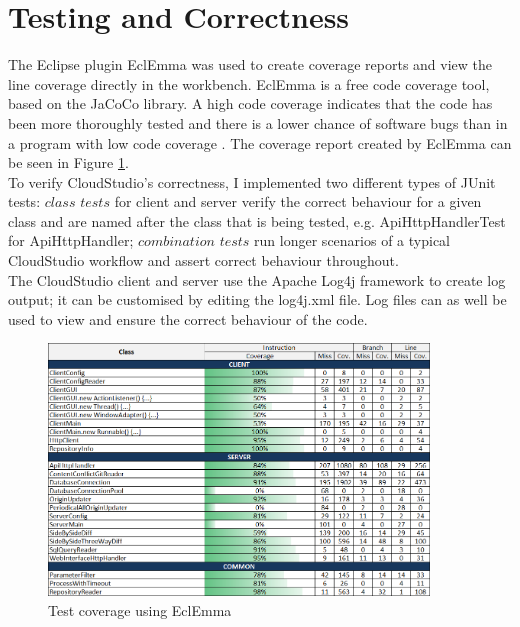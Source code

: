 \section{Testing and Correctness}

The Eclipse plugin EclEmma \cite{eclemma} was used to create coverage reports and view the line coverage directly in the workbench. EclEmma is a free code coverage tool, based on the JaCoCo library. A high code coverage indicates that the code has been more thoroughly tested and there is a lower chance of software bugs than in a program with low code coverage \cite{codecoverage}. The coverage report created by EclEmma can be seen in Figure \ref{fig:testcoverage}. \\

To verify CloudStudio's correctness, I implemented two different types of JUnit \cite{junit} tests: $class$ $tests$ for client and server verify the correct behaviour for a given class and are named after the class that is being tested, e.g. ApiHttpHandlerTest for ApiHttpHandler; $combination$ $tests$ run longer scenarios of a typical CloudStudio workflow and assert correct behaviour throughout. \\

The CloudStudio client and server use the Apache Log4j \cite{log4j} framework to create log output; it can be customised by editing the log4j.xml file. Log files can as well be used to view and ensure the correct behaviour of the code.


\begin{figure}[h!]
  \centering
      \includegraphics[width=0.9\textwidth]{coverage}
  \caption{Test coverage using EclEmma}
  \label{fig:testcoverage}
\end{figure}



